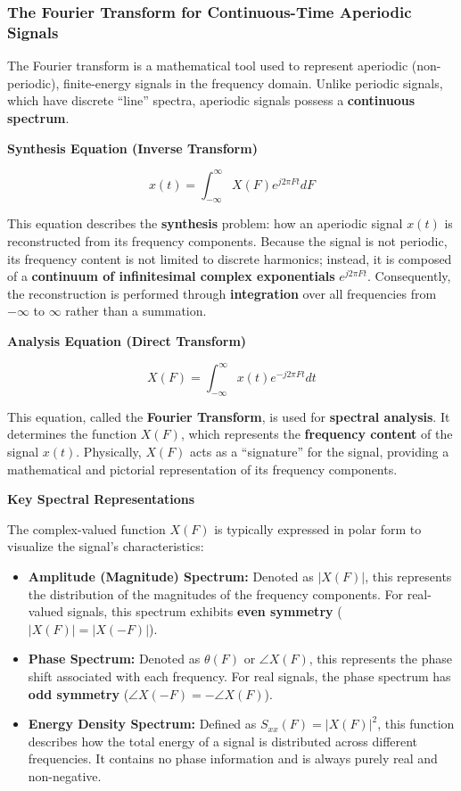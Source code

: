\hypertarget{the-fourier-transform-for-continuous-time-aperiodic-signals}{%
\subsubsection{The Fourier Transform for Continuous-Time Aperiodic
Signals}\label{the-fourier-transform-for-continuous-time-aperiodic-signals}}

The Fourier transform is a mathematical tool used to represent aperiodic
(non-periodic), finite-energy signals in the frequency domain. Unlike
periodic signals, which have discrete ``line'' spectra, aperiodic
signals possess a \textbf{continuous spectrum}.

\textbf{Synthesis Equation (Inverse Transform)}

\[x(t) = \int_{-\infty}^{\infty} X(F) e^{j2\pi Ft} dF\]

This equation describes the \textbf{synthesis} problem: how an aperiodic
signal \(x(t)\) is reconstructed from its frequency components. Because
the signal is not periodic, its frequency content is not limited to
discrete harmonics; instead, it is composed of a \textbf{continuum of
infinitesimal complex exponentials} \({e^{j2\pi Ft}}\). Consequently,
the reconstruction is performed through \textbf{integration} over all
frequencies from \(-\infty\) to \(\infty\) rather than a summation.

\textbf{Analysis Equation (Direct Transform)}

\[X(F) = \int_{-\infty}^{\infty} x(t) e^{-j2\pi Ft} dt\]

This equation, called the \textbf{Fourier Transform}, is used for
\textbf{spectral analysis}. It determines the function \(X(F)\), which
represents the \textbf{frequency content} of the signal \(x(t)\).
Physically, \(X(F)\) acts as a ``signature'' for the signal, providing a
mathematical and pictorial representation of its frequency components.

\textbf{Key Spectral Representations}

The complex-valued function \(X(F)\) is typically expressed in polar
form to visualize the signal's characteristics:

\begin{itemize}
\tightlist
\item
  \textbf{Amplitude (Magnitude) Spectrum:} Denoted as
  \textbf{\(|X(F)|\)}, this represents the distribution of the
  magnitudes of the frequency components. For real-valued signals, this
  spectrum exhibits \textbf{even symmetry} (\(|X(F)| = |X(-F)|\)).
\item
  \textbf{Phase Spectrum:} Denoted as \textbf{\(\theta(F)\)} or
  \textbf{\(\angle X(F)\)}, this represents the phase shift associated
  with each frequency. For real signals, the phase spectrum has
  \textbf{odd symmetry} (\(\angle X(-F) = -\angle X(F)\)).
\item
  \textbf{Energy Density Spectrum:} Defined as
  \textbf{\(S_{xx}(F) = |X(F)|^2\)}, this function describes how the
  total energy of a signal is distributed across different frequencies.
  It contains no phase information and is always purely real and
  non-negative.
\end{itemize}

